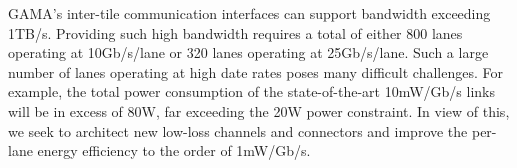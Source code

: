 \noindent
GAMA's inter-tile communication interfaces can support bandwidth exceeding 1TB/s.
Providing such high bandwidth requires a total of either 800 lanes operating at 10Gb/s/lane or 320 lanes operating at 25Gb/s/lane.  
Such a large number of lanes %
operating at high date rates poses many difficult challenges. 
For example, the total power consumption of the state-of-the-art 10mW/Gb/s links will be in excess of 80W, 
far exceeding the 20W power constraint.
In view of this, we seek to architect new low-loss channels and connectors and improve the per-lane energy efficiency to the order of 1mW/Gb/s. 


